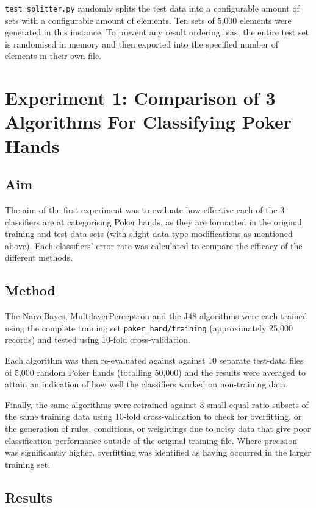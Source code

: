 \documentclass[10pt, a4paper]{article}
\begin{document}
\texttt{test\_splitter.py} randomly splits the test data into a configurable amount of sets with a configurable amount of elements. Ten sets of 5,000 elements were generated in this instance. To prevent any result ordering bias, the entire test set is randomised in memory and then exported into the specified number of elements in their own file.

\section*{Experiment 1: Comparison of 3 Algorithms For Classifying Poker Hands}

\subsection*{Aim}

The aim of the first experiment was to evaluate how effective each of the 3 classifiers are at categorising Poker hands, as they are formatted in the original training and test data sets (with slight data type modifications as mentioned above). Each classifiers' error rate was calculated to compare the efficacy of the different methods.

\subsection*{Method}

The Na\"iveBayes, MultilayerPerceptron and the J48 algorithms were each trained using the complete training set \texttt{poker\_hand/training} (approximately 25,000 records) and tested using 10-fold cross-validation.

Each algorithm was then re-evaluated against against 10 separate test-data files of 5,000 random Poker hands (totalling 50,000) and the results were averaged to attain an indication of how well the classifiers worked on non-training data.

Finally, the same algorithms were retrained against 3 small equal-ratio subsets of the same training data using 10-fold cross-validation to check for overfitting, or the generation of rules, conditions, or weightings due to noisy data that give poor classification performance outside of the original training file. Where precision was significantly higher, overfitting was identified as having occurred in the larger training set.

\subsection*{Results}
\end{document}
